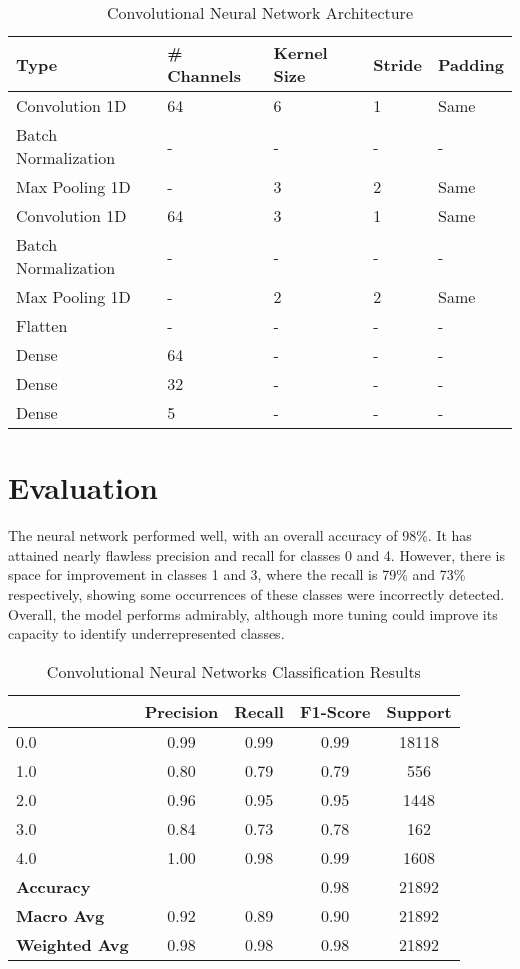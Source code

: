 \documentclass[conference]{article}
\begin{document}
\begin{table}[H]
    \centering
    \begin{tabular}{|l|l|l|l|l|}
    \hline
    Type & \# Channels & Kernel Size & Stride & Padding \\ \hline
    Convolution 1D & 64 & 6 & 1 & Same \\ \hline
    Batch Normalization & - & - & - & - \\ \hline
    Max Pooling 1D & - & 3 & 2 & Same \\ \hline
    Convolution 1D & 64 & 3 & 1 & Same \\ \hline
    Batch Normalization & - & - & - & - \\ \hline
    Max Pooling 1D & - & 2 & 2 & Same \\ \hline
    Flatten & - & - & - & - \\ \hline
    Dense & 64 & - & - & - \\ \hline
    Dense & 32 & - & - & - \\ \hline
    Dense & 5 & - & - & - \\ \hline
    \end{tabular}
    \caption{Convolutional Neural Network Architecture}
    \label{tab:my_label}
\end{table}


\section{Evaluation}

The neural network performed well, with an overall accuracy of 98\%. It has attained nearly flawless precision and recall for classes 0 and 4. However, there is space for improvement in classes 1 and 3, where the recall is 79\% and 73\% respectively, showing some occurrences of these classes were incorrectly detected. Overall, the model performs admirably, although more tuning could improve its capacity to identify underrepresented classes.

\begin{table}[H]
    \centering
    \begin{tabular}{lcccc}
        \toprule
        & Precision & Recall & F1-Score & Support \\
        \midrule
        0.0 & 0.99 & 0.99 & 0.99 & 18118 \\
        1.0 & 0.80 & 0.79 & 0.79 & 556 \\
        2.0 & 0.96 & 0.95 & 0.95 & 1448 \\
        3.0 & 0.84 & 0.73 & 0.78 & 162 \\
        4.0 & 1.00 & 0.98 & 0.99 & 1608 \\
        \midrule
        \textbf{Accuracy} & & & 0.98 & 21892 \\
        \textbf{Macro Avg} & 0.92 & 0.89 & 0.90 & 21892 \\
        \textbf{Weighted Avg} & 0.98 & 0.98 & 0.98 & 21892 \\
        \bottomrule
    \end{tabular}
    \caption{Convolutional Neural Networks Classification Results}
    \label{tab:classification_results}
\end{table}
\end{document}
